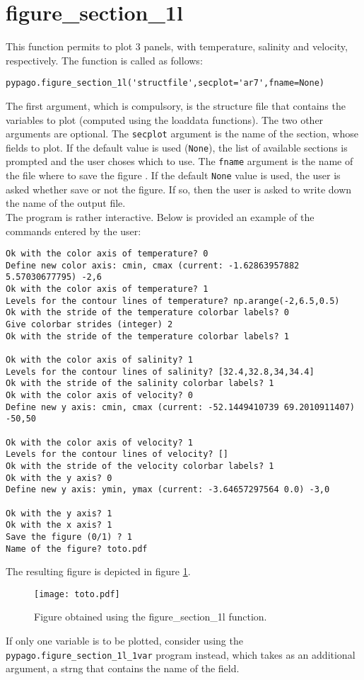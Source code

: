 \section{figure\_section\_1l}

This function permits to plot 3 panels, with temperature, salinity and
velocity, respectively. The function is called as follows:

\begin{verbatim}
pypago.figure_section_1l('structfile',secplot='ar7',fname=None)
\end{verbatim}

The first argument, which is compulsory, is the structure file that
contains the variables to plot (computed using the loaddata
functions). The two other arguments are optional. The \verb+secplot+
argument is the name of the section, whose fields to plot. If the
default value is used (\verb+None+), the list of available sections is
prompted and the user choses which to use. The
\verb+fname+ argument is the name of the file where to save the figure
. If the default \verb+None+ value is used, the user is asked whether
save or not the figure. If so, then the user is asked to write down
the name of the output file.\\

The program is rather interactive. Below is provided an example of the
commands entered by the user:

\begin{verbatim}
Ok with the color axis of temperature? 0
Define new color axis: cmin, cmax (current: -1.62863957882 5.57030677795) -2,6
Ok with the color axis of temperature? 1
Levels for the contour lines of temperature? np.arange(-2,6.5,0.5)
Ok with the stride of the temperature colorbar labels? 0
Give colorbar strides (integer) 2
Ok with the stride of the temperature colorbar labels? 1

Ok with the color axis of salinity? 1
Levels for the contour lines of salinity? [32.4,32.8,34,34.4]
Ok with the stride of the salinity colorbar labels? 1
Ok with the color axis of velocity? 0
Define new y axis: cmin, cmax (current: -52.1449410739 69.2010911407) -50,50

Ok with the color axis of velocity? 1
Levels for the contour lines of velocity? []
Ok with the stride of the velocity colorbar labels? 1
Ok with the y axis? 0
Define new y axis: ymin, ymax (current: -3.64657297564 0.0) -3,0

Ok with the y axis? 1
Ok with the x axis? 1
Save the figure (0/1) ? 1
Name of the figure? toto.pdf
\end{verbatim}

The resulting figure is depicted in figure \ref{fig:figure_section}.

\begin{figure}[h!]
\centering
\texttt{[image: toto.pdf]}
\caption{Figure obtained using the figure\_section\_1l function.}
\label{fig:figure_section}
\end{figure}

If only one variable is to be plotted, consider using the
\verb+pypago.figure_section_1l_1var+ program instead, which takes as an
additional argument, a strng that contains the name of the field.